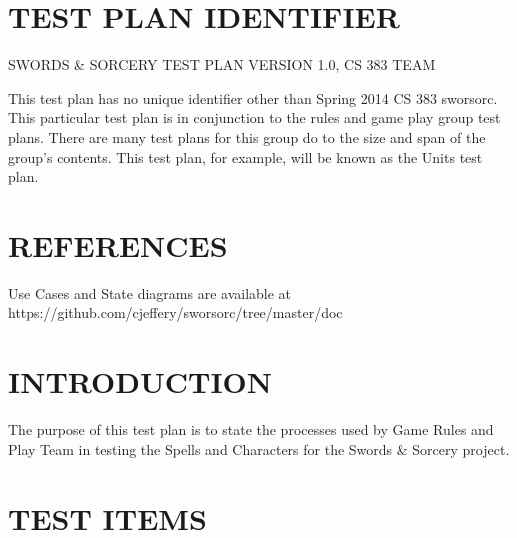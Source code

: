 \bigskip
\setcounter{page}{1}\pagestyle{Convertiv}

\section[IDENTIFIER]{\bfseries\color{black}
TEST PLAN IDENTIFIER}

{\color{black}
SWORDS \& SORCERY TEST PLAN VERSION 1.0, CS 383 TEAM

This test plan has no unique identifier other than Spring 2014 CS 383 sworsorc. This particular test plan is in conjunction to the rules and game play group test plans. There are many test plans for this group do to the size and span of the group's contents. This test plan, for example, will be known as the Units test plan.}


\section[REFERENCES]{\bfseries\color{black}
REFERENCES}

{\color{black}
Use Cases and State diagrams are available at https://github.com/cjeffery/sworsorc/tree/master/doc }



\section[INTRODUCTION]{\bfseries\color{black} INTRODUCTION}

{\color{black}

The purpose of this test plan is to state the processes used by Game Rules and Play Team in testing the Spells and Characters for the Swords \& Sorcery project.

}

\section[TEST ITEMS]{\bfseries\color{black} TEST ITEMS}


